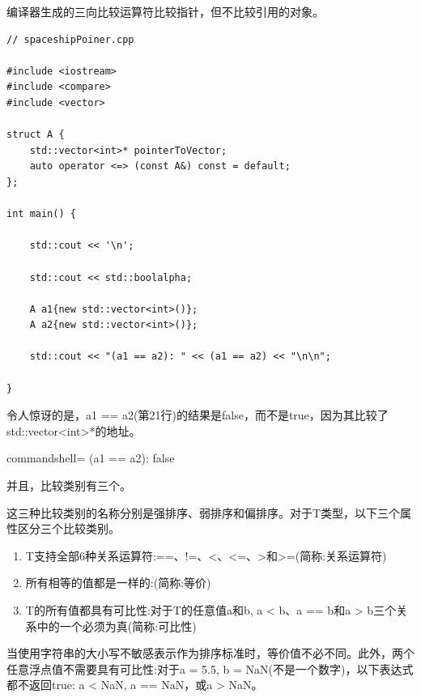 \begin{tcolorbox}[breakable,enhanced jigsaw,colback=red!5!white,colframe=red!75!black,title={指针比较}]

编译器生成的三向比较运算符比较指针，但不比较引用的对象。

\begin{lstlisting}[style=styleCXX]
// spaceshipPoiner.cpp

#include <iostream>
#include <compare>
#include <vector>

struct A {
	std::vector<int>* pointerToVector;
	auto operator <=> (const A&) const = default;
};

int main() {

	std::cout << '\n';
	
	std::cout << std::boolalpha;
	
	A a1{new std::vector<int>()};
	A a2{new std::vector<int>()};
	
	std::cout << "(a1 == a2): " << (a1 == a2) << "\n\n";

}
\end{lstlisting}

令人惊讶的是，a1 == a2(第21行)的结果是false，而不是true，因为其比较了std::vector<int>*的地址。

\begin{tcblisting}{commandshell={}}
(a1 == a2): false
\end{tcblisting}

\end{tcolorbox}

并且，比较类别有三个。


这三种比较类别的名称分别是强排序、弱排序和偏排序。对于T类型，以下三个属性区分三个比较类别。

\begin{enumerate}
\item 
T支持全部6种关系运算符:==、!=、<、<=、>和>=(简称:关系运算符)

\item 
所有相等的值都是一样的:(简称:等价)

\item 
T的所有值都具有可比性:对于T的任意值a和b, a < b、a == b和a > b三个关系中的一个必须为真(简称:可比性)
\end{enumerate}

当使用字符串的大小写不敏感表示作为排序标准时，等价值不必不同。此外，两个任意浮点值不需要具有可比性:对于a = 5.5, b = NaN(不是一个数字)，以下表达式都不返回true: a < NaN, a == NaN，或a > NaN。

